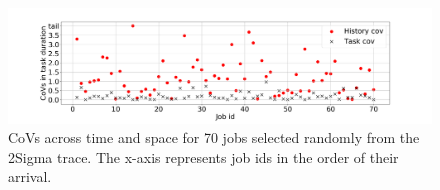 \begin{figure}[tp]
\vspace{-0.1in}
\mbox{\hspace{-0.3in}}\includegraphics[width=1.2\columnwidth]{figures/trace_analysis/slidingWindow_analysis_the_scatter_plot_avg_task_runtime_in_2Sigma_initial_history_window_30_days.png} %
\vspace{-0.25in}
	\caption{CoVs across time and space
	for 70 jobs selected randomly from the 2Sigma trace.
        The x-axis represents job ids in the order of their arrival.}
\vspace{-0.1in}
\label{fig:accuracy:trace_analysis_window:2Sigma:task_dur:scatter}
\end{figure}

